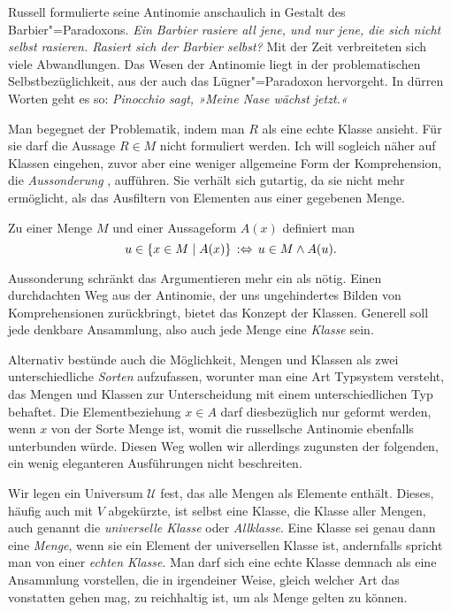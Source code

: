 Russell formulierte seine Antinomie anschaulich in Gestalt des
Barbier"=Paradoxons. \emph{Ein Barbier rasiere all jene, und nur jene, die
sich nicht selbst rasieren. Rasiert sich der Barbier selbst?}
Mit der Zeit verbreiteten sich viele Abwandlungen. Das Wesen der
Antinomie liegt in der problematischen Selbstbezüglichkeit, aus der
auch das Lügner"=Paradoxon hervorgeht. In dürren Worten geht es so:
\emph{Pinocchio sagt, »Meine Nase wächst jetzt.«}

Man begegnet der Problematik, indem man $R$ als eine echte
Klasse ansieht. Für sie darf die Aussage $R\in M$ nicht formuliert
werden. Ich will sogleich näher auf Klassen eingehen, zuvor aber eine
weniger allgemeine Form der Komprehension, die \emph{Aussonderung}%
, aufführen. Sie verhält sich gutartig, da sie nicht
mehr ermöglicht, als das Ausfiltern von Elementen aus einer gegebenen Menge.

\begin{Definition}[Aussonderung]\label{def:Aussonderung}\newlinefirst
Zu einer Menge $M$ und einer Aussageform $A(x)$ definiert man
\[u\in\{x\in M\mid A(x)\}\,:\Leftrightarrow\, u\in M\land A(u).\]
\end{Definition}

\noindent
Aussonderung schränkt das Argumentieren mehr ein als nötig. Einen
durchdachten Weg aus der Antinomie, der uns ungehindertes Bilden von
Komprehensionen zurückbringt, bietet das Konzept der Klassen.
Generell soll jede denkbare Ansammlung, also auch jede Menge eine
\emph{Klasse} sein.

Alternativ bestünde auch die Möglichkeit, Mengen und Klassen als zwei
unterschiedliche \emph{Sorten} aufzufassen, worunter man eine Art
Typsystem versteht, das Mengen und Klassen zur Unterscheidung mit einem
unterschiedlichen Typ behaftet. Die Elementbeziehung $x \in A$
darf diesbezüglich nur geformt werden, wenn $x$ von der Sorte Menge ist,
womit die russellsche Antinomie ebenfalls unterbunden würde. Diesen Weg
wollen wir allerdings zugunsten der folgenden, ein wenig eleganteren
Ausführungen nicht beschreiten.

Wir legen ein Universum $\mathcal U$ fest, das alle Mengen als Elemente
enthält. Dieses, häufig auch mit $V$ abgekürzte, ist selbst
eine Klasse, die Klasse aller Mengen, auch genannt die \emph{universelle
Klasse} oder \emph{Allklasse}. Eine Klasse sei genau dann eine
\emph{Menge}, wenn sie ein Element der universellen Klasse ist,
andernfalls spricht man von einer \emph{echten Klasse}. Man darf sich
eine echte Klasse demnach als eine Ansammlung vorstellen, die in
irgendeiner Weise, gleich welcher Art das vonstatten gehen mag, zu
reichhaltig ist, um als Menge gelten zu können.

